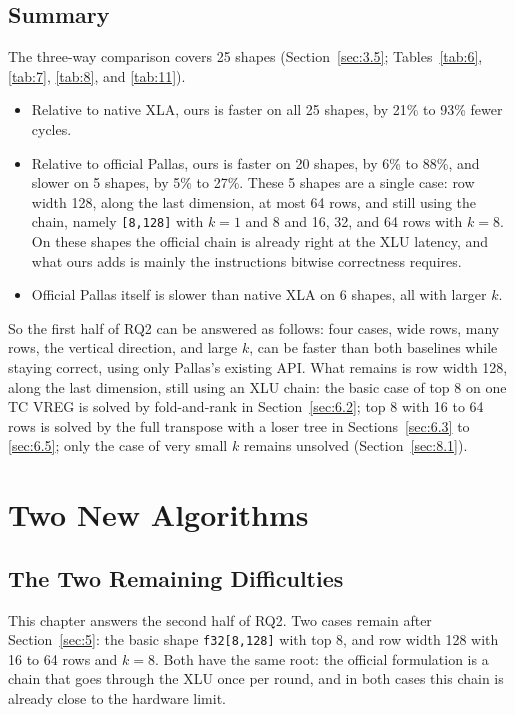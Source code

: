 \documentclass[sigconf,nonacm,balance=false]{acmart}
\newcommand{\code}[1]{\texttt{#1}}
\begin{document}
\subsection{Summary}
\label{sec:5.6}

The three-way comparison covers 25 shapes (Section~\ref{sec:3.5}; Tables~\ref{tab:6}, \ref{tab:7}, \ref{tab:8}, and \ref{tab:11}).

\begin{itemize}
\item Relative to native XLA, ours is faster on all 25 shapes, by 21\% to 93\% fewer cycles.
\item Relative to official Pallas, ours is faster on 20 shapes, by 6\% to 88\%, and slower on 5 shapes, by 5\% to 27\%. These 5 shapes are a single case: row width 128, along the last dimension, at most 64 rows, and still using the chain, namely \code{[8,\allowbreak{}128]} with $k = 1$ and 8 and 16, 32, and 64 rows with $k = 8$. On these shapes the official chain is already right at the XLU latency, and what ours adds is mainly the instructions bitwise correctness requires.
\item Official Pallas itself is slower than native XLA on 6 shapes, all with larger $k$.
\end{itemize}

So the first half of RQ2 can be answered as follows: four cases, wide rows, many rows, the vertical direction, and large $k$, can be faster than both baselines while staying correct, using only Pallas's existing API. What remains is row width 128, along the last dimension, still using an XLU chain: the basic case of top 8 on one TC VREG is solved by fold-and-rank in Section~\ref{sec:6.2}; top 8 with 16 to 64 rows is solved by the full transpose with a loser tree in Sections~\ref{sec:6.3} to \ref{sec:6.5}; only the case of very small $k$ remains unsolved (Section~\ref{sec:8.1}).

\section{Two New Algorithms}
\label{sec:6}

\subsection{The Two Remaining Difficulties}
\label{sec:6.1}

This chapter answers the second half of RQ2. Two cases remain after Section~\ref{sec:5}: the basic shape \code{f32[8,\allowbreak{}128]} with top 8, and row width 128 with 16 to 64 rows and $k = 8$. Both have the same root: the official formulation is a chain that goes through the XLU once per round, and in both cases this chain is already close to the hardware limit.
\end{document}
